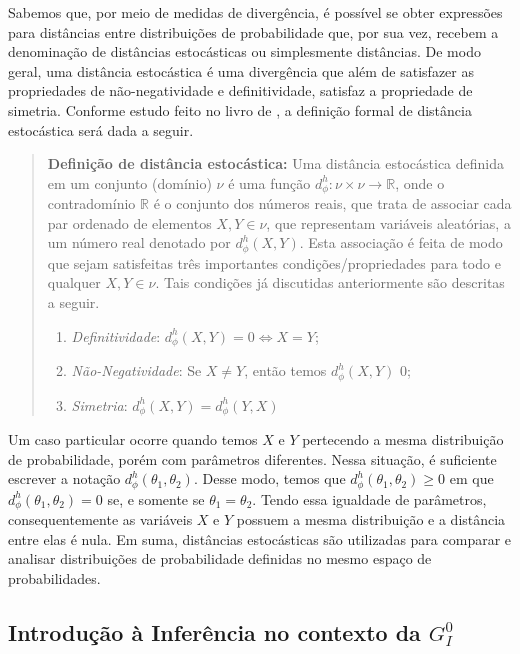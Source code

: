 Sabemos que, por meio de medidas de divergência, é possível se obter expressões para distâncias entre distribuições de probabilidade que, por sua vez, recebem a denominação de distâncias estocásticas ou simplesmente distâncias. De modo geral, uma distância estocástica é uma divergência que além de satisfazer as propriedades de não-negatividade e definitividade, satisfaz a propriedade de simetria. Conforme estudo feito no livro de \citet{StatisticalInferenceBasedonDivergenceMeasures}, a definição formal de distância estocástica será dada a seguir. 
\begin{quote}
    \textbf{Definição de distância estocástica:} Uma distância estocástica definida em um conjunto (domínio) $\nu$ é uma função $ d_\phi^h: \nu \times \nu \rightarrow \mathbb{R} $, onde o contradomínio $\mathbb{R}$ é o conjunto dos números reais, que trata de associar cada par ordenado de elementos $X, Y \in \nu$, que representam variáveis aleatórias, a um número real denotado por $d_\phi^h(X, Y)$. Esta associação é feita de modo que sejam satisfeitas três importantes condições/propriedades para todo e qualquer $X, Y \in \nu$. Tais condições já discutidas anteriormente são descritas a seguir.
    \begin{enumerate}
        \item \textit{Definitividade}: $d_\phi^h(X, Y) = 0 \Leftrightarrow X = Y$;
        \item \textit{Não-Negatividade}: Se $X \neq Y$, então temos $d_\phi^h(X, Y)$ \text{>} $0$;
        \item \textit{Simetria}: $d_\phi^h(X, Y) = d_\phi^h(Y, X)$
    \end{enumerate}
\end{quote}

Um caso particular ocorre quando temos $X$ e $Y$ pertecendo a mesma distribuição de probabilidade, porém com parâmetros diferentes. Nessa situação, é suficiente escrever a notação $d_\phi^h(\theta_1, \theta_2)$. Desse modo, temos que $d_\phi^h(\theta_1, \theta_2) \geq 0$ em que $d_\phi^h(\theta_1, \theta_2) = 0$ se, e somente se $\theta_1 = \theta_2$. Tendo essa igualdade de parâmetros, consequentemente as variáveis $X$ e $Y$ possuem a mesma distribuição e a distância entre elas é nula. Em suma, distâncias estocásticas são utilizadas para comparar e analisar distribuições de probabilidade definidas no mesmo espaço de probabilidades.

\subsection{Introdução à Inferência no contexto da $G_I^0$}

